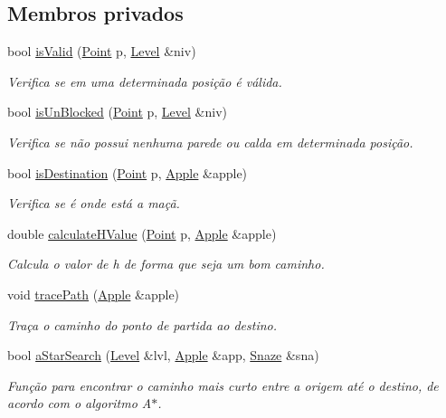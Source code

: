 \subsection*{Membros privados}
\begin{DoxyCompactItemize}
\item 
bool \hyperlink{classAI_a1680ae2c44e5cb60bf0c4f9e50892e46}{is\+Valid} (\hyperlink{structPoint}{Point} p, \hyperlink{classLevel}{Level} \&niv)
\begin{DoxyCompactList}\small\item\em Verifica se em uma determinada posição é válida. \end{DoxyCompactList}\item 
bool \hyperlink{classAI_a5585946408be2dfe1111aa2bfc8b6869}{is\+Un\+Blocked} (\hyperlink{structPoint}{Point} p, \hyperlink{classLevel}{Level} \&niv)
\begin{DoxyCompactList}\small\item\em Verifica se não possui nenhuma parede ou calda em determinada posição. \end{DoxyCompactList}\item 
bool \hyperlink{classAI_a6b37ac577106682d3e8aa9a19b9ca9cc}{is\+Destination} (\hyperlink{structPoint}{Point} p, \hyperlink{classApple}{Apple} \&apple)
\begin{DoxyCompactList}\small\item\em Verifica se é onde está a maçã. \end{DoxyCompactList}\item 
double \hyperlink{classAI_a8984d85c80379ff81776016bfad5101f}{calculate\+H\+Value} (\hyperlink{structPoint}{Point} p, \hyperlink{classApple}{Apple} \&apple)
\begin{DoxyCompactList}\small\item\em Calcula o valor de \textquotesingle{}h\textquotesingle{} de forma que seja um bom caminho. \end{DoxyCompactList}\item 
void \hyperlink{classAI_a4cba0636ec1133d67a7cb77284beebe5}{trace\+Path} (\hyperlink{classApple}{Apple} \&apple)
\begin{DoxyCompactList}\small\item\em Traça o caminho do ponto de partida ao destino. \end{DoxyCompactList}\item 
bool \hyperlink{classAI_a9c11e5ad4d67d2afd2b1300189f96faf}{a\+Star\+Search} (\hyperlink{classLevel}{Level} \&lvl, \hyperlink{classApple}{Apple} \&app, \hyperlink{classSnaze}{Snaze} \&sna)
\begin{DoxyCompactList}\small\item\em Função para encontrar o caminho mais curto entre a origem até o destino, de acordo com o algoritmo A$\ast$. \end{DoxyCompactList}\end{DoxyCompactItemize}
